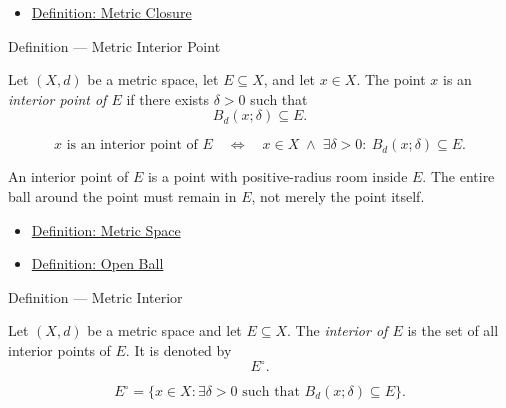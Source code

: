 \begin{dependencies}
\begin{itemize}
  \item \hyperref[def:metric-closure]{Definition: Metric Closure}
\end{itemize}
\end{dependencies}

\begin{definitionbox}{Definition --- Metric Interior Point}
\begin{definition}\label{def:metric-interior-point}
Let \((X,d)\) be a metric space, let \(E\subseteq X\), and let \(x\in X\).
The point \(x\) is an \emph{interior point of \(E\)} if there exists
\(\delta>0\) such that
\[
  B_d(x;\delta)\subseteq E.
\]
\end{definition}
\end{definitionbox}

\begin{remark*}
\[
x\text{ is an interior point of }E
\quad\Longleftrightarrow\quad
x\in X
\;\land\;
\exists\delta>0{:}\ B_d(x;\delta)\subseteq E.
\]
\end{remark*}

\begin{remark*}[Interpretation]
An interior point of \(E\) is a point with positive-radius room inside \(E\).
The entire ball around the point must remain in \(E\), not merely the point
itself.
\end{remark*}

\begin{dependencies}
\begin{itemize}
  \item \hyperref[def:metric-space]{Definition: Metric Space}
  \item \hyperref[def:metric-open-ball]{Definition: Open Ball}
\end{itemize}
\end{dependencies}

\begin{definitionbox}{Definition --- Metric Interior}
\begin{definition}\label{def:metric-interior}
Let \((X,d)\) be a
 metric space and let \(E\subseteq X\).  The \emph{interior
of \(E\)} is the set of all interior points of \(E\).  It is denoted by
\[
  E^\circ.
\]
\end{definition}
\end{definitionbox}

\begin{remark*}
\[
E^\circ
=
\{x\in X:\exists\delta>0\text{ such that }B_d(x;\delta)\subseteq E\}.
\]
\end{remark*}

